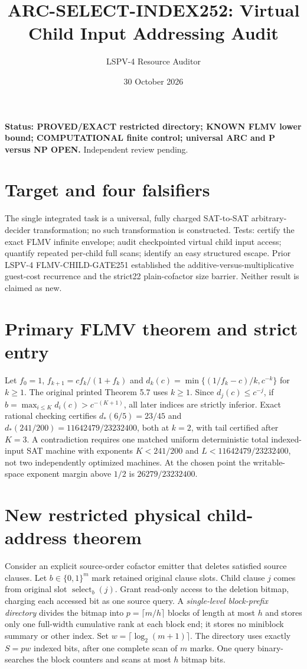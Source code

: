 \documentclass[10pt]{article}
\title{ARC-SELECT-INDEX252: Virtual Child Input Addressing Audit}
\author{LSPV-4 Resource Auditor}
\date{30 October 2026}
\begin{document}
\maketitle
\noindent\textbf{Status: PROVED/EXACT restricted directory; KNOWN FLMV lower bound; COMPUTATIONAL finite control; universal ARC and P versus NP OPEN.} Independent review pending.

\section*{Target and four falsifiers}
The single integrated task is a universal, fully charged SAT-to-SAT arbitrary-decider transformation; no such transformation is constructed. Tests: certify the exact FLMV infinite envelope; audit checkpointed virtual child input access; quantify repeated per-child full scans; identify an easy structured escape. Prior LSPV-4 FLMV-CHILD-GATE251 established the additive-versus-multiplicative guest-cost recurrence and the strict22 plain-cofactor size barrier. Neither result is claimed as new.

\section*{Primary FLMV theorem and strict entry}
Let $f_0=1$, $f_{k+1}=cf_k/(1+f_k)$ and
$d_k(c)=\min\{(1/f_k-c)/k,c^{-k}\}$ for $k\ge1$. The original printed Theorem 5.7 uses $k\ge1$. Since $d_j(c)\le c^{-j}$, if $b=\max_{i\le K}d_i(c)>c^{-(K+1)}$, all later indices are strictly inferior. Exact rational checking certifies $d_*(6/5)=23/45$ and
$d_*(241/200)=11642479/23232400$, both at $k=2$, with tail certified after $K=3$. A contradiction requires one matched uniform deterministic total indexed-input SAT machine with exponents $K<241/200$ and $L<11642479/23232400$, not two independently optimized machines. At the chosen point the writable-space exponent margin above $1/2$ is $26279/23232400$.

\section*{New restricted physical child-address theorem}
Consider an explicit source-order cofactor emitter that deletes satisfied source clauses. Let $b\in\{0,1\}^m$ mark retained original clause slots. Child clause $j$ comes from original slot $\operatorname{select}_b(j)$. Grant read-only access to the deletion bitmap, charging each accessed bit as one source query. A \emph{single-level block-prefix directory} divides the bitmap into $p=\lceil m/h\rceil$ blocks of length at most $h$ and stores only one full-width cumulative rank at each block end; it stores no miniblock summary or other index. Set $w=\lceil\log_2(m+1)\rceil$. The directory uses exactly $S=pw$ indexed bits, after one complete scan of $m$ marks. One query binary-searches the block counters and scans at most $h$ bitmap bits.
\end{document}
